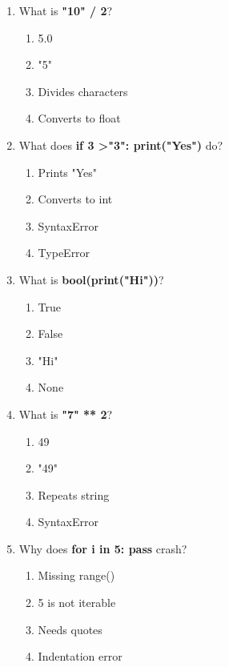 \documentclass{article}
\begin{document}
\begin{multicols*}{4}
\begin{enumerate}
        \item What is \textbf{"10" / 2}?
        \begin{enumerate}[label=(\Alph*)]
            \item 5.0
            \item "5"
            \item Divides characters
            \item Converts to float
        \end{enumerate}

        \item What does \textbf{if 3 \textgreater "3": print("Yes")} do?
        \begin{enumerate}[label=(\Alph*)]
            \item Prints "Yes"
            \item Converts to int
            \item SyntaxError
            \item TypeError
        \end{enumerate}

        \item What is \textbf{bool(print("Hi"))}?
        \begin{enumerate}[label=(\Alph*)]
            \item True
            \item False
            \item "Hi"
            \item None
        \end{enumerate}

        \item What is \textbf{"7" ** 2}?
        \begin{enumerate}[label=(\Alph*)]
            \item 49
            \item "49"
            \item Repeats string
            \item SyntaxError
        \end{enumerate}

        \item Why does \textbf{for i in 5: pass} crash?
        \begin{enumerate}[label=(\Alph*)]
            \item Missing range()
            \item 5 is not iterable
            \item Needs quotes
            \item Indentation error
        \end{enumerate}


\end{enumerate}
\end{multicols*}
\end{document}
